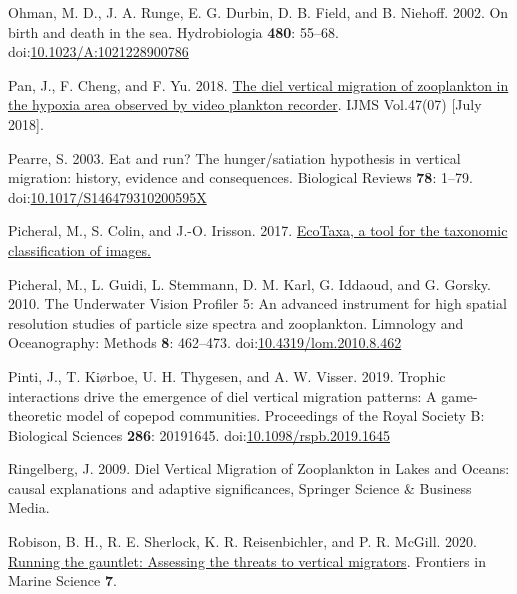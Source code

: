 \documentclass[
]{article}
\newlength{\cslhangindent}
\newlength{\cslentryspacingunit} %
\newenvironment{CSLReferences}[2] %
 {%
  \setlength{\parindent}{0pt}
  \ifodd #1
  \let\oldpar\par
  \def\par{\hangindent=\cslhangindent\oldpar}
  \fi
  \setlength{\parskip}{#2\cslentryspacingunit}
 }%
 {}
\begin{document}
\begin{CSLReferences}{1}{0}
\leavevmode{}%
Ohman, M. D., J. A. Runge, E. G. Durbin, D. B. Field, and B. Niehoff.
2002. On birth and death in the sea. Hydrobiologia \textbf{480}: 55--68.
doi:\href{https://doi.org/10.1023/A:1021228900786}{10.1023/A:1021228900786}

\leavevmode{}%
Pan, J., F. Cheng, and F. Yu. 2018.
\href{http://nopr.niscpr.res.in/handle/123456789/44619}{The diel
vertical migration of zooplankton in the hypoxia area observed by video
plankton recorder}. IJMS Vol.47(07) {[}July 2018{]}.

\leavevmode{}%
Pearre, S. 2003. Eat and run? The hunger/satiation hypothesis in
vertical migration: history, evidence and consequences. Biological
Reviews \textbf{78}: 1--79.
doi:\href{https://doi.org/10.1017/S146479310200595X}{10.1017/S146479310200595X}

\leavevmode{}%
Picheral, M., S. Colin, and J.-O. Irisson. 2017.
\href{http://ecotaxa.obs-vlfr.fr}{EcoTaxa, a tool for the taxonomic
classification of images.}

\leavevmode{}%
Picheral, M., L. Guidi, L. Stemmann, D. M. Karl, G. Iddaoud, and G.
Gorsky. 2010. The Underwater Vision Profiler 5: An advanced instrument
for high spatial resolution studies of particle size spectra and
zooplankton. Limnology and Oceanography: Methods \textbf{8}: 462--473.
doi:\href{https://doi.org/10.4319/lom.2010.8.462}{10.4319/lom.2010.8.462}

\leavevmode{}%
Pinti, J., T. Kiørboe, U. H. Thygesen, and A. W. Visser. 2019. Trophic
interactions drive the emergence of diel vertical migration patterns: A
game-theoretic model of copepod communities. Proceedings of the Royal
Society B: Biological Sciences \textbf{286}: 20191645.
doi:\href{https://doi.org/10.1098/rspb.2019.1645}{10.1098/rspb.2019.1645}

\leavevmode{}%
Ringelberg, J. 2009. Diel Vertical Migration of Zooplankton in Lakes and
Oceans: causal explanations and adaptive significances, Springer Science
\& Business Media.

\leavevmode{}%
Robison, B. H., R. E. Sherlock, K. R. Reisenbichler, and P. R. McGill.
2020.
\href{https://www.frontiersin.org/articles/10.3389/fmars.2020.00064}{Running
the gauntlet: Assessing the threats to vertical migrators}. Frontiers in
Marine Science \textbf{7}.


\end{CSLReferences}
\end{document}
